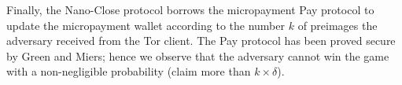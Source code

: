 Finally, the Nano-Close protocol borrows the micropayment Pay protocol to update the micropayment wallet according to the number $k$ of preimages the adversary received from the Tor client.
The Pay protocol has been proved secure by Green and Miers; hence we observe that the adversary cannot win the game with a non-negligible probability (claim more than $k \times \delta$).

